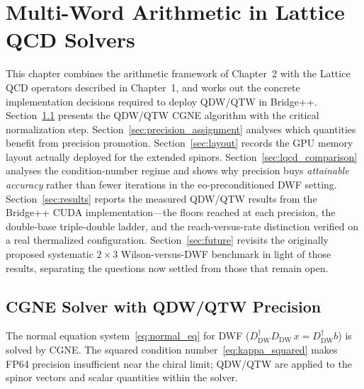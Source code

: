 \documentclass[12pt,a4paper]{article}
\begin{document}
\section{Multi-Word Arithmetic in Lattice QCD Solvers}
\label{sec:application}

This chapter combines the arithmetic framework of Chapter~2 with the
Lattice QCD operators described in Chapter~1, and works out the
concrete implementation decisions required to deploy QDW/QTW in Bridge++.
Section~\ref{sec:cgne} presents the QDW/QTW CGNE algorithm with the
critical normalization step.
Section~\ref{sec:precision_assignment} analyses which quantities benefit
from precision promotion.
Section~\ref{sec:layout} records the GPU memory layout actually deployed for
the extended spinors.
Section~\ref{sec:lqcd_comparison} analyses the condition-number regime and
shows why precision buys \emph{attainable accuracy} rather than fewer
iterations in the eo-preconditioned DWF setting.
Section~\ref{sec:results} reports the measured QDW/QTW results from the
Bridge++ CUDA implementation---the floors reached at each precision, the
double-base triple-double ladder, and the reach-versus-rate distinction
verified on a real thermalized configuration.
Section~\ref{sec:future} revisits the originally proposed systematic
$2\times3$ Wilson-versus-DWF benchmark in light of those results, separating
the questions now settled from those that remain open.

\subsection{CGNE Solver with QDW/QTW Precision}
\label{sec:cgne}

The normal equation system~\eqref{eq:normal_eq} for DWF
($D_{\mathrm{DW}}^\dagger D_{\mathrm{DW}}\,x = D_{\mathrm{DW}}^\dagger b$)
is solved by CGNE.
The squared condition number~\eqref{eq:kappa_squared} makes
FP64 precision insufficient near the chiral limit; QDW/QTW are applied to
the spinor vectors and scalar quantities within the solver.
\end{document}

